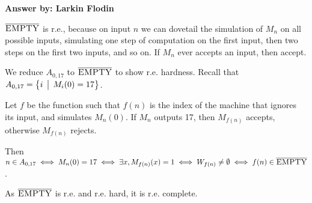 \documentclass[12pt]{article}
\begin{document}
\begin{enumerate}
{\bf Answer by: Larkin Flodin} 

$\overline{\mbox{{\rm\sc EMPTY}}}$ is r.e., because on input $n$ we can dovetail the simulation of $M_n$ on all possible inputs, simulating one step of computation on the first input, then two steps on the first two inputs, and so on. If $M_n$ ever accepts an input, then accept.

We reduce $A_{0, 17}$ to $\overline{\mbox{{\rm\sc EMPTY}}}$ to show r.e. hardness.  Recall that  $A_{0, 17} =
\bigl\{ i \,\bigm|\, M_i(0) = 17 \bigr\}$. 

Let $f$ be the function such that $f(n)$ is the index of the machine that ignores its input, and simulates $M_n(0)$. If $M_n$ outputs 17, then $M_{f(n)}$ accepts, otherwise $M_{f(n)}$ rejects.

Then $n \in A_{0, 17} \iff M_n(0) = 17 \iff \exists x, M_{f(n)}(x) = 1 \iff W_{f(n)} \neq \emptyset \iff f(n) \in \overline{\mbox{{\rm\sc EMPTY}}}$.

As $\overline{\mbox{{\rm\sc EMPTY}}}$ is r.e. and r.e. hard, it is r.e. complete.



\end{enumerate}
\end{document}
